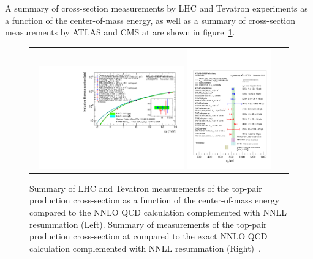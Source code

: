 \begin{refsection}
A summary of \ttbar cross-section measurements by LHC and Tevatron experiments as a function of the center-of-mass energy, as well as a summary of \ttbar cross-section measurements by ATLAS and CMS at \beamenergy are shown in figure~\ref{ttbar_cross-section}.
\begin{figure}[htb]
  \begin{center}
    \begin{tabular}{cc}
        \includegraphics[width=0.60\textwidth]{fig_TopQuark/tt_curve_toplhcwg_nov22.pdf}
        \includegraphics[width=0.35\textwidth]{fig_TopQuark/tt_xsec_13TeV_nov22.pdf}
    \end{tabular}
    \caption{Summary of LHC and Tevatron measurements of the top-pair production cross-section as a function of the center-of-mass energy compared to the NNLO QCD calculation complemented with NNLL resummation (Left).
    Summary of measurements of the top-pair production cross-section at \beamenergy compared to the exact NNLO QCD calculation complemented with NNLL resummation (Right)~\cite{LHCTopWGSummaryPlots}.
            }
    \label{ttbar_cross-section}
  \end{center}
\end{figure}


\end{refsection}
